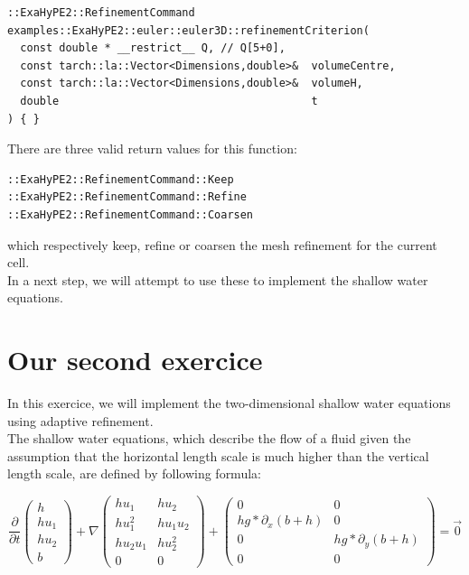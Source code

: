 \documentclass[12pt,letterpaper]{article}
\begin{document}
\begin{lstlisting}[style = C++]
::ExaHyPE2::RefinementCommand examples::ExaHyPE2::euler::euler3D::refinementCriterion(
  const double * __restrict__ Q, // Q[5+0],
  const tarch::la::Vector<Dimensions,double>&  volumeCentre,
  const tarch::la::Vector<Dimensions,double>&  volumeH,
  double                                       t
) { }
\end{lstlisting}

There are three valid return values for this function:

\begin{lstlisting}[style = C++]
::ExaHyPE2::RefinementCommand::Keep
::ExaHyPE2::RefinementCommand::Refine
::ExaHyPE2::RefinementCommand::Coarsen
\end{lstlisting}

which respectively keep, refine or coarsen the mesh refinement for the current cell.\\
In a next step, we will attempt to use these to implement the shallow water equations.

\newpage

\section{Our second exercice}

In this exercice, we will implement the two-dimensional shallow water equations using adaptive refinement.\\
The shallow water equations, which describe the flow of a fluid given the assumption that the horizontal length scale is much higher than the vertical length scale, are defined by following formula:

\begin{equation*} \label{SWE}
    \frac{\partial}{\partial t}\left(
    \begin{array}{lr} h \\
        h u_1 \\
        h u_2 \\
        b 
        \end{array} \right) +
    \nabla \begin{pmatrix}
        h u_1           & h u_2     \\
        h u_1^2         & h u_1 u_2 \\
        h u_2 u_1       & h u_2^2   \\
        0               & 0
    \end{pmatrix} +
    \begin{pmatrix}
        0                     & 0\\
        h g*\partial_x(b+h)   & 0\\
        0                     & h g*\partial_y(b+h) \\
        0                     & 0
    \end{pmatrix}  = \vec{0}
\end{equation*}
\end{document}

